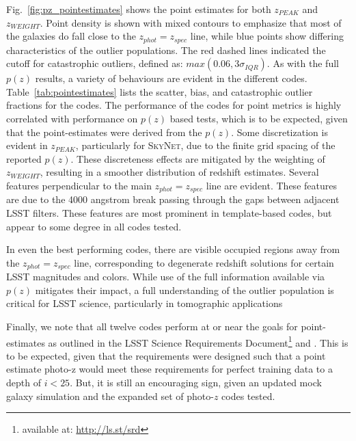 Fig.~\ref{fig:pz_pointestimates}  shows the point estimates for both $z_{PEAK}$ and $z_{WEIGHT}$.  Point density is shown with mixed contours to emphasize that most of the galaxies do fall close to the $z_{phot}=z_{spec}$ line, while blue points show differing characteristics of the outlier populations.  The red dashed lines indicated the cutoff for catastrophic outliers, defined as: $max(0.06,3\sigma_{IQR})$.  As with the full $p(z)$ results, a variety of behaviours are evident in the different codes.  Table~\ref{tab:pointestimates} lists the scatter, bias, and catastrophic outlier fractions for the codes.  The performance of the codes for point metrics is highly correlated with performance on $p(z)$ based tests, which is to be expected, given that the point-estimates were derived from the $p(z)$.  Some discretization is evident in $z_{PEAK}$, particularly for \textsc{SkyNet}, due to the finite grid spacing of the reported $p(z)$.  These discreteness effects are mitigated by the weighting of $z_{WEIGHT}$, resulting in a smoother distribution of redshift estimates.  Several features perpendicular to the main $z_{phot}=z_{spec}$ line are evident.  These features are due to the 4000 angstrom break passing through the gaps between adjacent LSST filters.  These features are most prominent in template-based codes, but appear to some degree in all codes tested.

In even the best performing codes, there are visible occupied regions away from the $z_{phot}=z_{spec}$ line, corresponding to degenerate redshift solutions for certain LSST magnitudes and colors.  While use of the full information available via $p(z)$ mitigates their impact, a full understanding of the outlier population is critical for LSST science, particularly in tomographic applications %

Finally, we note that all twelve codes perform at or near the goals for point-estimates as outlined in the LSST Science Requirements Document\footnote{available at: \url{http://ls.st/srd}} and \citet{Graham:17}.  This is to be expected, given that the requirements were designed such that a point estimate photo-z would meet these requirements for perfect training data to a depth of $i<25$.  But, it is still an encouraging sign, given an updated mock galaxy simulation and the expanded set of photo-$z$ codes tested.

